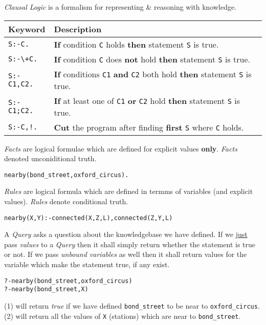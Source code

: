 \documentclass[11pt,a4paper]{article}
\begin{document}
\textit{Clausal Logic} is a formalism for representing \& reasoning with knowledge.
\begin{center}
\begin{tabular}{l|l}
\textbf{Keyword}&\textbf{Description}\\
\hline
{\lstinline!S:-C.!}&\textbf{If} condition {\lstinline!C!} holds \textbf{then} statement {\lstinline!S!} is true.\\
{\lstinline!S:-\+C.!}&\textbf{If} condition {\lstinline!C!} does \textbf{not} hold \textbf{then} statement {\lstinline!S!} is true.\\
{\lstinline!S:-C1,C2.!}&\textbf{If} conditions {\lstinline!C1!} \textbf{and} {\lstinline!C2!} both hold \textbf{then} statement {\lstinline!S!} is true.\\
{\lstinline!S:-C1;C2.!}&\textbf{If} at least one of {\lstinline!C1!} \textbf{or} {\lstinline!C2!} hold \textbf{then} statement {\lstinline!S!} is true.\\
{\lstinline|S:-C,!.|}&\textbf{Cut} the program after finding \textbf{first} \lstinline!S! where \lstinline!C! holds.
\end{tabular}
\end{center}

\textit{Facts} are logical formulae which are defined for explicit values \textbf{only}. \textit{Facts} denoted unconiditional truth.
\begin{center}{\lstinline!nearby(bond_street,oxford_circus).!}\end{center}
\textit{Rules} are logical formula which are defined in termms of variables (and explicit values). \textit{Rules} denote conditional truth.
\begin{center}{\lstinline!nearby(X,Y):-connected(X,Z,L),connected(Z,Y,L)!}\end{center}

A \textit{Query} asks a question about the knowledgebase we have defined. If we \underline{just} pass \textit{values} to a \textit{Query} then it shall simply return whether the statement is true or not. If we pass \textit{unbound variables} as well then it shall return values for the variable which make the statement true, if any exist.\\

\begin{lstlisting}
?-nearby(bond_street,oxford_circus)
?-nearby(bond_street,X)
\end{lstlisting}
(1) will return \textit{true} if we have defined \lstinline!bond_street! to be near to \lstinline!oxford_circus!.\\
(2) will return all the values of \lstinline!X! (\ie stations) which are near to \lstinline!bond_street!.\\
\end{document}

